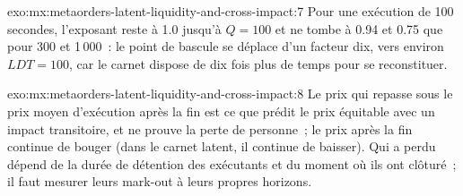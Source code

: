 \begin{solution}{exo:mx:metaorders-latent-liquidity-and-cross-impact:7}
Pour une exécution de 100 secondes, l'exposant reste à 1.0 jusqu'à $Q=100$ et ne tombe à 0.94 et 0.75 que pour 300 et 1\,000~: le point de bascule se déplace d'un facteur dix, vers
environ $LDT=100$, car le carnet dispose de dix fois plus de temps pour se reconstituer.
\end{solution}

\begin{solution}{exo:mx:metaorders-latent-liquidity-and-cross-impact:8}
Le prix qui repasse sous le prix moyen d'exécution après la fin est ce que prédit le prix équitable avec un impact transitoire, et ne prouve la perte de personne~; le prix après
la fin continue de bouger (dans le carnet latent, il continue de baisser). Qui a perdu dépend de la durée de détention des exécutants et du moment où ils ont clôturé~; il faut mesurer leurs mark-out
à leurs propres horizons.
\end{solution}

